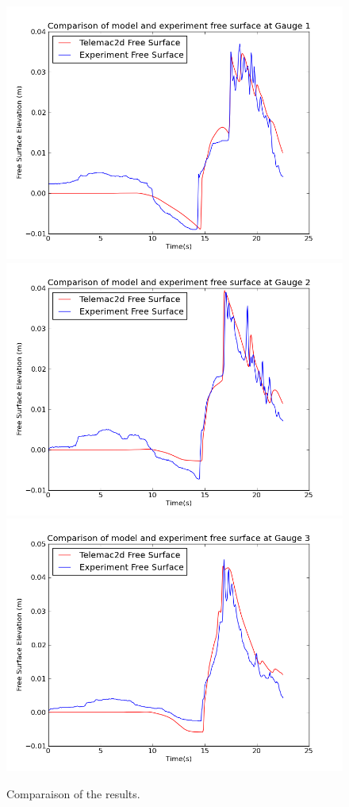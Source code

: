 \begin{figure}[H]
\centering
\includegraphics[width=.8\textwidth]{img/res_g1.png}
\includegraphics[width=.8\textwidth]{img/res_g2.png}
\includegraphics[width=.8\textwidth]{img/res_g3.png}
\caption{Comparaison of the results.}
\label{fig:monai:res}
\end{figure}
